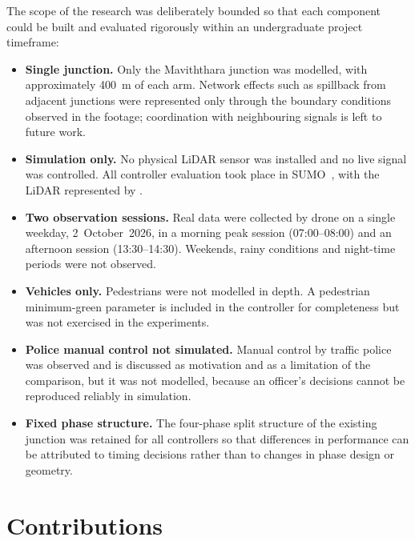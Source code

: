 The scope of the research was deliberately bounded so that each component could be built and evaluated rigorously within an undergraduate project timeframe:
\begin{itemize}[itemsep=2pt]
  \item \textbf{Single junction.} Only the Maviththara junction was modelled, with approximately 400~m of each arm. Network effects such as spillback from adjacent junctions were represented only through the boundary conditions observed in the footage; coordination with neighbouring signals is left to future work.
  \item \textbf{Simulation only.} No physical LiDAR sensor was installed and no live signal was controlled. All controller evaluation took place in SUMO~\cite{lopez2018sumo}, with the LiDAR represented by \vls{}.
  \item \textbf{Two observation sessions.} Real data were collected by drone on a single weekday, 2~October~2026, in a morning peak session (07:00--08:00) and an afternoon session (13:30--14:30). Weekends, rainy conditions and night-time periods were not observed.
  \item \textbf{Vehicles only.} Pedestrians were not modelled in depth. A pedestrian minimum-green parameter is included in the controller for completeness but was not exercised in the experiments.
  \item \textbf{Police manual control not simulated.} Manual control by traffic police was observed and is discussed as motivation and as a limitation of the comparison, but it was not modelled, because an officer's decisions cannot be reproduced reliably in simulation.
  \item \textbf{Fixed phase structure.} The four-phase split structure of the existing junction was retained for all controllers so that differences in performance can be attributed to timing decisions rather than to changes in phase design or geometry.
\end{itemize}

\section{Contributions}\label{sec:intro-contributions}

